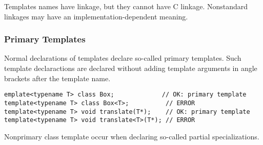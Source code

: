 \documentclass[a4paper,12pt]{book}
\begin{document}
Templates names have linkage, but they cannot have C linkage. Nonstandard linkages may have an implementation-dependent meaning.
\subsubsection{Primary Templates}
Normal declarations of templates declare so-called primary templates. Such template declaractions are declared without adding template arguments in angle brackets after the template name.
\begin{verbatim}
emplate<typename T> class Box;             // OK: primary template 
template<typename T> class Box<T>;          // ERROR 
template<typename T> void translate(T*);    // OK: primary template 
template<typename T> void translate<T>(T*); // ERROR 
\end{verbatim}

Nonprimary class template occur when declaring so-called partial specializations.
\end{document}
